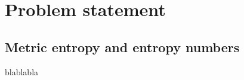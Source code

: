 \documentclass[../sample_report.tex]{subfiles}
\begin{document}
\chapter{Problem statement} \label{ch:1_problem_statement}

\section{Metric entropy and entropy numbers}

blablabla
\end{document}
